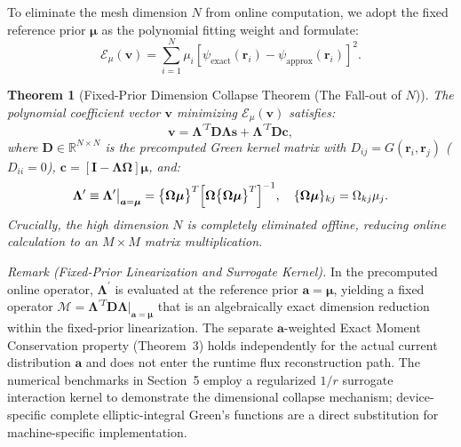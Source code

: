 \documentclass[11pt,a4paper]{article}
\newtheorem{theorem}{Theorem}
\begin{document}
To eliminate the mesh dimension $N$ from online computation, we adopt the fixed reference prior $\bm{\mu}$ as the polynomial fitting weight and formulate:
\begin{equation}
    \mathcal{E}_\mu(\bm{v}) = \sum_{i=1}^N \mu_i \left[ \psi_{\mathrm{exact}}(\bm{r}_i) - \psi_{\mathrm{approx}}(\bm{r}_i) \right]^2.
    \label{eq:weighted_lsq_mu}
\end{equation}

\begin{theorem}[Fixed-Prior Dimension Collapse Theorem (The Fall-out of $N$)]
The polynomial coefficient vector $\bm{v}$ minimizing $\mathcal{E}_\mu(\bm{v})$ satisfies:
\begin{equation}
    \bm{v} = \bm{\Lambda}^{\prime T} \bm{D} \bm{\Lambda} \bm{s} + \bm{\Lambda}^{\prime T} \bm{D} \bm{c},
    \label{eq:magic_matrix}
\end{equation}
where $\bm{D} \in \mathbb{R}^{N \times N}$ is the precomputed Green kernel matrix with $D_{ij} = G(\bm{r}_i, \bm{r}_j)$ ($D_{ii} = 0$), $\bm{c} = [\bm{I} - \bm{\Lambda}\bm{\Omega}]\bm{\mu}$, and:
\begin{equation}
    \bm{\Lambda}^{\prime} \equiv \bm{\Lambda}^{\prime}\big|_{\bm{a}=\bm{\mu}} = \bigl\{\bm{\Omega}\bm{\mu}\bigr\}^T \Bigl[ \bm{\Omega} \bigl\{\bm{\Omega}\bm{\mu}\bigr\}^T \Bigr]^{-1}, \quad \{\bm{\Omega}\bm{\mu}\}_{kj} = \Omega_{kj} \mu_j.
    \label{eq:lambda_prime}
\end{equation}
Crucially, the high dimension $N$ is completely eliminated offline, reducing online calculation to an $M \times M$ matrix multiplication.
\end{theorem}

\noindent\textit{Remark (Fixed-Prior Linearization and Surrogate Kernel).}
In the precomputed online operator, $\bm{\Lambda}^{\prime}$ is evaluated at the reference prior $\bm{a} = \bm{\mu}$, yielding a fixed operator $\mathcal{M} = \bm{\Lambda}^{\prime T} \bm{D} \bm{\Lambda}|_{\bm{a}=\bm{\mu}}$ that is an algebraically exact dimension reduction within the fixed-prior linearization. The separate $\bm{a}$-weighted Exact Moment Conservation property (Theorem~3) holds independently for the actual current distribution $\bm{a}$ and does not enter the runtime flux reconstruction path. The numerical benchmarks in Section~5 employ a regularized $1/r$ surrogate interaction kernel to demonstrate the dimensional collapse mechanism; device-specific complete elliptic-integral Green's functions are a direct substitution for machine-specific implementation.
\end{document}
